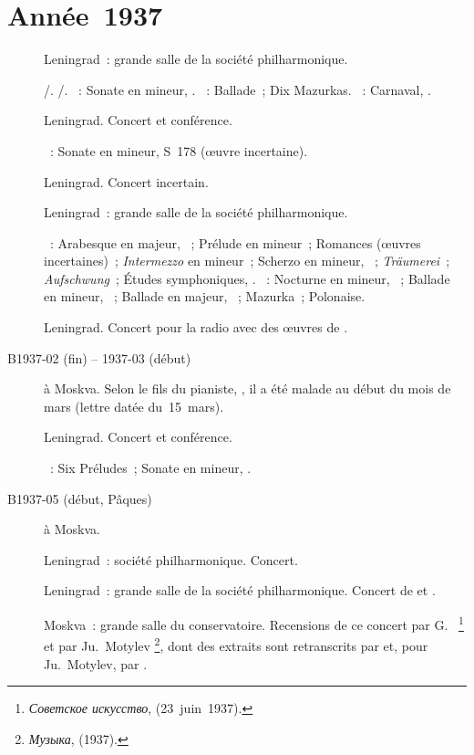 \section{Année~1937}

\begin{description}
 \item[]
 Leningrad~: grande salle de la société philharmonique.

 \textsc{\Buxtehude{}/\Nikolaiev{}}.
 \textsc{\Pachelbel{}/\Nikolaiev{}}.
 \textsc{\Beethoven{}}~: Sonate en \kF mineur, .
 \textsc{\Chopin{}}~: Ballade~; Dix Mazurkas.
 \textsc{\Schumann{}}~: Carnaval, .
 \item[]
 Leningrad.
 Concert et conférence.

 \textsc{\Liszt{}}~: Sonate en \kB mineur, S~178 (œuvre incertaine).
 \item[]
 Leningrad.
 Concert incertain.
 \item[]
 Leningrad~: grande salle de la société philharmonique.

 \textsc{\Schumann{}}~: Arabesque en \kC majeur, ~; Prélude en \kB
 \Flat mineur~; Romances (œuvres incertaines)~; \emph{Intermezzo} en \kF
 mineur~; Scherzo en \kG mineur,  ~; \emph{Träumerei}~;
 \emph{Aufschwung}~; Études symphoniques, .
 \textsc{\Chopin{}}~: Nocturne en \kC mineur,  ~; Ballade
 en \kF mineur, ~; Ballade en \kA \Flat majeur, ~;
 Mazurka~; Polonaise.
 \item[]
 Leningrad.
 Concert pour la radio avec des œuvres de \Scriabine{}.
 \item[B1937-02 (fin) -- 1937-03 (début)]
 \VSofronitsky{} à Moskva.
 Selon le fils du pianiste, \ASofronitsky{}, il a été malade au début du
 mois de mars (lettre datée du~15~mars).
 \item[]
 Leningrad.
 Concert et conférence.

 \textsc{\Scriabine{}}~: Six Préludes~; Sonate en \kF \Sharp mineur,
 .
 \item[B1937-05 (début, Pâques)]
 \VSofronitsky{} à Moskva.
 \item[]
 Leningrad~: société philharmonique.
 Concert.
 \item[]
 Leningrad~: grande salle de la société philharmonique.
 Concert de \VSofronitsky{} et \VSlivinsky{}.
 \item[]
 Moskva~: grande salle du conservatoire.
 Recensions de ce concert par G.~\Neuhaus{}%
 \footnote{\foreignlanguage{russian}{\emph{Советское искусство}},
  (23~juin~1937).}
 et par Ju.~Motylev%
 \footnote{\foreignlanguage{russian}{\emph{Музыка}},  (1937).},
 dont des extraits sont retranscrits par \citet[p.~428-429]{Milshteyn82a}
 et, pour Ju.~Motylev, par \citet[p.~387]{Nikonovich08}.


\end{description}
